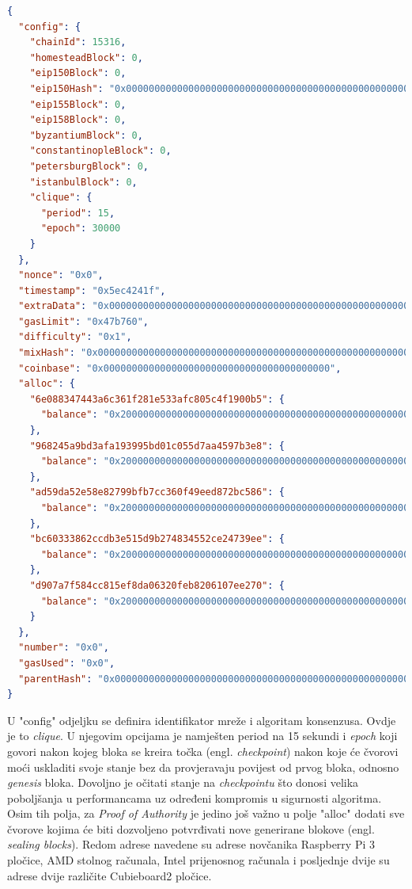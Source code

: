 \documentclass[times, utf8, zavrsni, numeric]{fer}
\begin{document}
\begin{lstlisting}[language=json,firstnumber=1]
    {
  "config": {
    "chainId": 15316,
    "homesteadBlock": 0,
    "eip150Block": 0,
    "eip150Hash": "0x0000000000000000000000000000000000000000000000000000000000000000",
    "eip155Block": 0,
    "eip158Block": 0,
    "byzantiumBlock": 0,
    "constantinopleBlock": 0,
    "petersburgBlock": 0,
    "istanbulBlock": 0,
    "clique": {
      "period": 15,
      "epoch": 30000
    }
  },
  "nonce": "0x0",
  "timestamp": "0x5ec4241f",
  "extraData": "0x00000000000000000000000000000000000000000000000000000000000000006e088347443a6c361f281e533afc805c4f1900b5968245a9bd3afa193995bd01c055d7aa4597b3e8ad59da52e58e82799bfb7cc360f49eed872bc586bc60333862ccdb3e515d9b274834552ce24739eed907a7f584cc815ef8da06320feb8206107ee2700000000000000000000000000000000000000000000000000000000000000000000000000000000000000000000000000000000000000000000000000000000000",
  "gasLimit": "0x47b760",
  "difficulty": "0x1",
  "mixHash": "0x0000000000000000000000000000000000000000000000000000000000000000",
  "coinbase": "0x0000000000000000000000000000000000000000",
  "alloc": {
    "6e088347443a6c361f281e533afc805c4f1900b5": {
      "balance": "0x200000000000000000000000000000000000000000000000000000000000000"
    },
    "968245a9bd3afa193995bd01c055d7aa4597b3e8": {
      "balance": "0x200000000000000000000000000000000000000000000000000000000000000"
    },
    "ad59da52e58e82799bfb7cc360f49eed872bc586": {
      "balance": "0x200000000000000000000000000000000000000000000000000000000000000"
    },
    "bc60333862ccdb3e515d9b274834552ce24739ee": {
      "balance": "0x200000000000000000000000000000000000000000000000000000000000000"
    },
    "d907a7f584cc815ef8da06320feb8206107ee270": {
      "balance": "0x200000000000000000000000000000000000000000000000000000000000000"
    }
  },
  "number": "0x0",
  "gasUsed": "0x0",
  "parentHash": "0x0000000000000000000000000000000000000000000000000000000000000000"
}
\end{lstlisting}

U "config" odjeljku se definira identifikator mreže i algoritam konsenzusa. Ovdje je to \emph{clique}. U njegovim opcijama je namješten
period na 15 sekundi i \emph{epoch} koji govori nakon kojeg bloka se kreira točka (engl. \emph{checkpoint}) nakon koje će čvorovi moći
uskladiti svoje stanje bez da provjeravaju povijest od prvog bloka, odnosno \emph{genesis} bloka. Dovoljno je očitati stanje na \emph{checkpointu}
što donosi velika poboljšanja u performancama uz određeni kompromis u sigurnosti algoritma. \\
Osim tih polja, za \emph{Proof of Authority} je jedino još važno u polje "alloc" dodati sve čvorove kojima će biti dozvoljeno potvrđivati
nove generirane blokove (engl. \emph{sealing blocks}). Redom adrese navedene su adrese novčanika Raspberry Pi 3 pločice, AMD stolnog računala, Intel prijenosnog
računala i posljednje dvije su adrese dvije različite Cubieboard2 pločice. 
\end{document}
